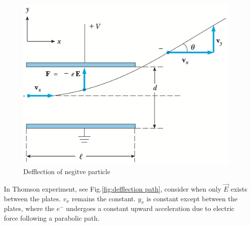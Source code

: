         \begin{figure}
            \includegraphics[width=0.9\linewidth]{figures/thomson experiment.png}
            \caption{Defflection of negitve particle}
            \label{fig:defflection path}
        \end{figure}
        
        \bulletpar In Thomson experiment, see Fig.\eqref{fig:defflection path}, consider when only $\vec{E}$ exists between the plates. 
        $v_x$ remains the constant. $y_x$ is
        constant except between the plates, where the $e^-$ undergoes a constant upward acceleration due to electric force 
        following a parabolic path.

